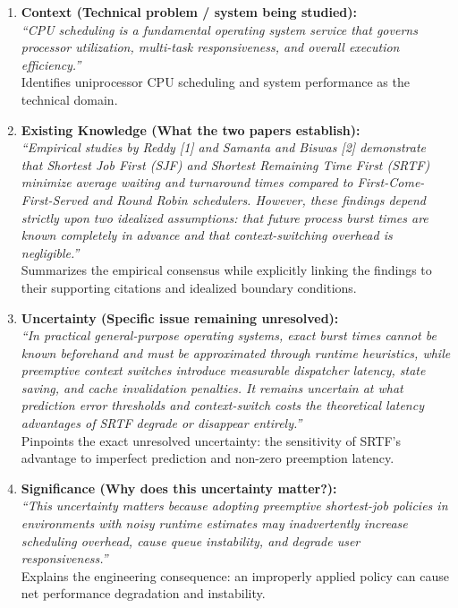 \documentclass[11pt]{article}
\newcommand{\topicTitle}[1]{
    \vspace{1.2em}\noindent{\fontsize{14}{16.8}\selectfont \textbf{#1}}\par\vspace{0.5em}
}
\begin{document}
\vspace{1.0em}
\topicTitle{Logical Progression Breakdown}


\begin{enumerate}[leftmargin=1.5em]
    \item \textbf{Context (Technical problem / system being studied):} \\
    \textit{``CPU scheduling is a fundamental operating system service that governs processor utilization, multi-task responsiveness, and overall execution efficiency.''} \\
    Identifies uniprocessor CPU scheduling and system performance as the technical domain.
    
    \item \textbf{Existing Knowledge (What the two papers establish):} \\
    \textit{``Empirical studies by Reddy [1] and Samanta and Biswas [2] demonstrate that Shortest Job First (SJF) and Shortest Remaining Time First (SRTF) minimize average waiting and turnaround times compared to First-Come-First-Served and Round Robin schedulers. However, these findings depend strictly upon two idealized assumptions: that future process burst times are known completely in advance and that context-switching overhead is negligible.''} \\
    Summarizes the empirical consensus while explicitly linking the findings to their supporting citations and idealized boundary conditions.

    \item \textbf{Uncertainty (Specific issue remaining unresolved):} \\
    \textit{``In practical general-purpose operating systems, exact burst times cannot be known beforehand and must be approximated through runtime heuristics, while preemptive context switches introduce measurable dispatcher latency, state saving, and cache invalidation penalties. It remains uncertain at what prediction error thresholds and context-switch costs the theoretical latency advantages of SRTF degrade or disappear entirely.''} \\
    Pinpoints the exact unresolved uncertainty: the sensitivity of SRTF's advantage to imperfect prediction and non-zero preemption latency.

    \item \textbf{Significance (Why does this uncertainty matter?):} \\
    \textit{``This uncertainty matters because adopting preemptive shortest-job policies in environments with noisy runtime estimates may inadvertently increase scheduling overhead, cause queue instability, and degrade user responsiveness.''} \\
    Explains the engineering consequence: an improperly applied policy can cause net performance degradation and instability.


\end{enumerate}
\end{document}
